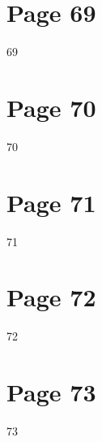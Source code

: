 \documentclass{article}
\begin{document}
\section*{Page 69}
   
 
 69  
 


\section*{Page 70}
   
 
 70  
 


\section*{Page 71}
   
 
 71  
 


\section*{Page 72}
   
 
 72  
 


\section*{Page 73}
   
 
 73  
 
 
\end{document}
